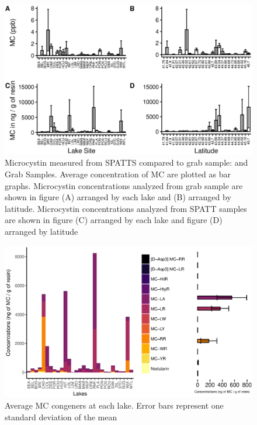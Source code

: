 \begin{figure}[!hp]
\includegraphics[width=\textwidth]{figures/spatttboxplotlake}
\caption{
Microcystin measured from SPATTS compared to grab sample: and Grab Samples. Average concentration of MC are plotted as bar graphs. Microcystin concentrations analyzed from grab sample are shown in figure (A) arranged by each lake and (B) arranged by latitude. Microcystin concentrations analyzed from SPATT samples are shown in figure (C) arranged by each lake and figure (D) arranged by latitude
}
\label{fig:spattbox}
\end{figure}

\begin{figure}[!ht]
\includegraphics[width=\textwidth]{figures/barspatts}
\caption{Average MC congeners at each lake. Error bars represent one standard deviation of the mean}
\label{fig:barspatts}
\end{figure}

